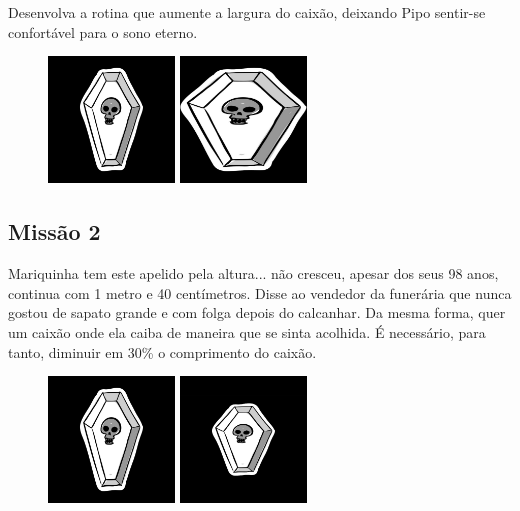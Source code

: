 \documentclass[
	12pt,				%
	oneside,			%
	a4paper,			%
	english,			%
	french,				%
	spanish,			%
	brazil,				%
	]{abntex2}
\begin{document}
\begin{apendicesenv}
Desenvolva a rotina que aumente a largura do caixão, deixando Pipo sentir-se confortável para o sono eterno.

\begin{figure}[ht]
\centering
\includegraphics[width=0.3\textwidth]{imagens/desafios/coffin2dcenter.jpg}
\includegraphics[width=0.3\textwidth]{imagens/desafios/mission1.png}
\end{figure}

\subsection{Missão 2}

Mariquinha tem este apelido pela altura... não cresceu, apesar dos seus 98 anos, continua com 1 metro e 40 centímetros. Disse ao vendedor da funerária que nunca gostou de sapato grande e com folga depois do calcanhar. Da mesma forma, quer um caixão onde ela caiba de maneira que se sinta acolhida. É necessário, para tanto, diminuir em 30\% o comprimento do caixão.

\begin{figure}[ht]
\centering
\includegraphics[width=0.3\textwidth]{imagens/desafios/coffin2dcenter.jpg}
\includegraphics[width=0.3\textwidth]{imagens/desafios/mission2.png}
\end{figure}


\end{apendicesenv}
\end{document}
